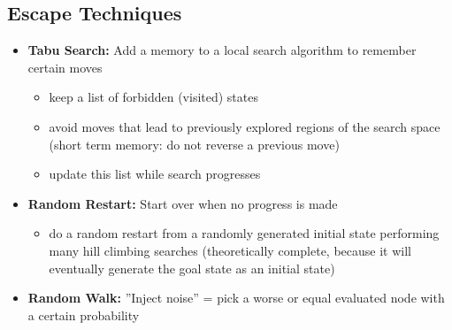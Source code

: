\documentclass[conference, a4paper]{styles/acmsiggraph}
\begin{document}
    \subsection{Escape Techniques}
        \begin{itemize}
            \item \textbf{Tabu Search:}
                Add a memory to a local search algorithm to remember certain moves
                \begin{itemize}
                    \item keep a list of forbidden (visited) states
                    \item avoid moves that lead to previously explored regions of the search space\newline
                        (short term memory: do not reverse a previous move)
                    \item update this list while search progresses
                \end{itemize}
            \item \textbf{Random Restart:}
                Start over when no progress is made
                \begin{itemize}
                    \item do a random restart from a randomly generated initial state performing many hill climbing searches\newline
                        (theoretically complete, because it will eventually generate the goal state as an initial state)
                \end{itemize}
            \item \textbf{Random Walk:} 
                ''Inject noise'' = pick a worse or equal evaluated node with a certain probability
        \end{itemize}
    
    
\end{document}
